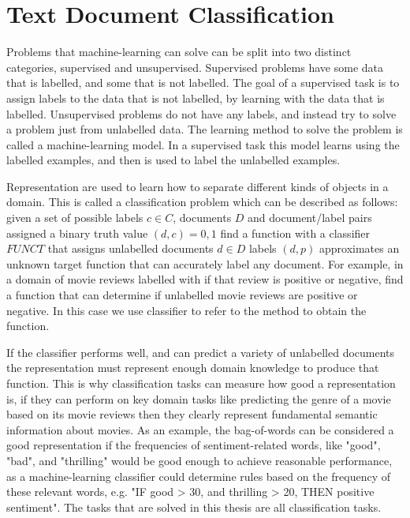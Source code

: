 \section{Text Document Classification}\label{ch2:classifiers}

Problems that machine-learning can solve can be split into two distinct categories, supervised and unsupervised. Supervised problems have some data that is labelled, and some that is not labelled. The goal of a supervised task is to assign labels to the data that is not labelled, by learning with the data that is labelled. Unsupervised problems do not have any labels, and instead try to solve a problem just from unlabelled data. The learning method to solve the problem is called a machine-learning model. In a supervised task this model  learns using the labelled examples, and then is used to label the unlabelled examples.

Representation are  used to learn how to separate different kinds of objects in a domain. This is called a classification problem which can be described as follows: given a set of possible labels $c \in C$, documents $D$ and document/label pairs assigned a binary truth value $(d, c) = {0, 1}$ find a function with a classifier $FUNCT$ that assigns unlabelled documents $d \in D$ labels $(d, p) $ approximates an unknown target function that can accurately label any document. For example, in a domain of movie reviews labelled with if that review is positive or negative, find a function that can determine if unlabelled movie reviews are positive or negative. In this case we use classifier to refer to the method to obtain the function.

If the classifier performs well, and can predict a variety of unlabelled documents  the representation must represent enough domain knowledge  to produce that function. This is why classification tasks can measure how good a representation is, if they can perform on key domain tasks like predicting the genre of a movie based on its movie reviews then they clearly represent fundamental semantic information about movies.  As an example,  the bag-of-words can be considered a good representation if the frequencies of sentiment-related words, like "good", "bad", and "thrilling" would be good enough to achieve reasonable performance, as a machine-learning classifier could determine rules based on the frequency of these relevant words, e.g. "IF good > 30, and thrilling > 20, THEN positive sentiment". The tasks that are solved in this thesis are all classification tasks. 


